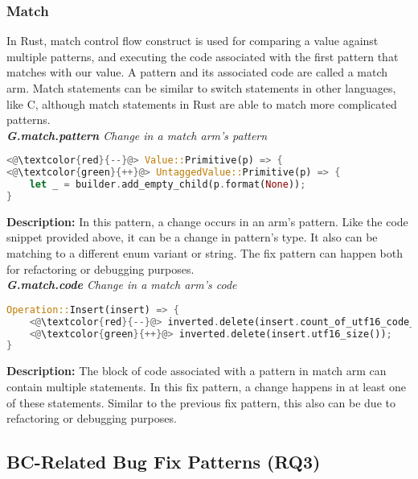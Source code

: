 \subsubsection{Match}

In Rust, match control flow construct is used for comparing a value against multiple patterns, and executing the code associated with the first pattern that matches with our value. A pattern and its associated code are called a match arm. Match statements can be similar to switch statements in other languages, like C, although match statements in Rust are able to match more complicated patterns.\\

\noindent\textit{\textbf{G.match.pattern} Change in a match arm's pattern}

\begin{lstlisting}[language=Rust, style=colouredRust]
<@\textcolor{red}{--}@> Value::Primitive(p) => {
<@\textcolor{green}{++}@> UntaggedValue::Primitive(p) => {
    let _ = builder.add_empty_child(p.format(None));
}
\end{lstlisting}

\noindent\textbf{Description:} In this pattern, a change occurs in an arm's pattern. Like the code snippet provided above, it can be a change in pattern's type. It also can be matching to a different enum variant or string. The fix pattern can happen both for refactoring or debugging purposes. \\

\noindent\textit{\textbf{G.match.code} Change in a match arm's code}

\begin{lstlisting}[language=Rust, style=colouredRust]
Operation::Insert(insert) => {
    <@\textcolor{red}{--}@> inverted.delete(insert.count_of_utf16_code_units());
    <@\textcolor{green}{++}@> inverted.delete(insert.utf16_size());
}
\end{lstlisting}

\noindent\textbf{Description:} The block of code associated with a pattern in match arm can contain multiple statements. In this fix pattern, a change happens in at least one of these statements. Similar to the previous fix pattern, this also can be due to refactoring or debugging purposes.

\subsection{\label{sec:bc_patterns}BC-Related Bug Fix Patterns (RQ3)}

